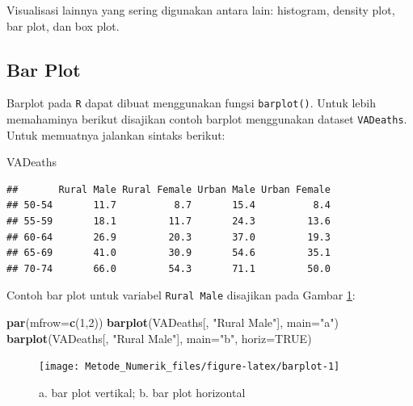 \documentclass[]{book}
\newenvironment{Shaded}{\begin{snugshade}}{\end{snugshade}}
\newcommand{\DataTypeTok}[1]{\textcolor[rgb]{0.13,0.29,0.53}{#1}}
\newcommand{\DecValTok}[1]{\textcolor[rgb]{0.00,0.00,0.81}{#1}}
\newcommand{\KeywordTok}[1]{\textcolor[rgb]{0.13,0.29,0.53}{\textbf{#1}}}
\newcommand{\NormalTok}[1]{#1}
\newcommand{\OtherTok}[1]{\textcolor[rgb]{0.56,0.35,0.01}{#1}}
\newcommand{\StringTok}[1]{\textcolor[rgb]{0.31,0.60,0.02}{#1}}
\theoremstyle{definition}
\theoremstyle{definition}
\theoremstyle{definition}
\theoremstyle{remark}
\begin{document}
Visualisasi lainnya yang sering digunakan antara lain: histogram, density plot, bar plot, dan box plot.

\hypertarget{barplot}{%
\subsection{Bar Plot}\label{barplot}}

Barplot pada \texttt{R} dapat dibuat menggunakan fungsi \texttt{barplot()}. Untuk lebih memahaminya berikut disajikan contoh barplot menggunakan dataset \texttt{VADeaths}. Untuk memuatnya jalankan sintaks berikut:

\begin{Shaded}
\begin{Highlighting}[]
\NormalTok{VADeaths}
\end{Highlighting}
\end{Shaded}

\begin{verbatim}
##       Rural Male Rural Female Urban Male Urban Female
## 50-54       11.7          8.7       15.4          8.4
## 55-59       18.1         11.7       24.3         13.6
## 60-64       26.9         20.3       37.0         19.3
## 65-69       41.0         30.9       54.6         35.1
## 70-74       66.0         54.3       71.1         50.0
\end{verbatim}

Contoh bar plot untuk variabel \texttt{Rural\ Male} disajikan pada Gambar \ref{fig:barplot}:

\begin{Shaded}
\begin{Highlighting}[]
\KeywordTok{par}\NormalTok{(}\DataTypeTok{mfrow=}\KeywordTok{c}\NormalTok{(}\DecValTok{1}\NormalTok{,}\DecValTok{2}\NormalTok{))}
\KeywordTok{barplot}\NormalTok{(VADeaths[, }\StringTok{"Rural Male"}\NormalTok{], }\DataTypeTok{main=}\StringTok{"a"}\NormalTok{)}
\KeywordTok{barplot}\NormalTok{(VADeaths[, }\StringTok{"Rural Male"}\NormalTok{], }\DataTypeTok{main=}\StringTok{"b"}\NormalTok{, }\DataTypeTok{horiz=}\OtherTok{TRUE}\NormalTok{)}
\end{Highlighting}
\end{Shaded}

\begin{figure}

{\centering \texttt{[image: Metode\_Numerik\_files/figure-latex/barplot-1]} 

}

\caption{a. bar plot vertikal; b. bar plot horizontal}\label{fig:barplot}
\end{figure}
\end{document}
